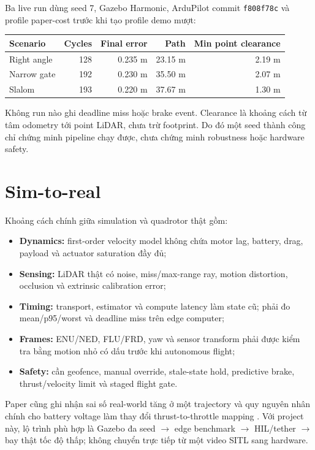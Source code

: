\documentclass[10pt,a4paper]{article}
\newcommand{\code}[1]{\texttt{#1}}
\begin{document}
Ba live run dùng seed 7, Gazebo Harmonic, ArduPilot commit \code{f808f78c} và
profile paper-cost trước khi tạo profile demo mượt:
\begin{center}\small
\begin{tabular}{lrrrr}
\toprule
\textbf{Scenario} & \textbf{Cycles} & \textbf{Final error} & \textbf{Path} & \textbf{Min point clearance}\\
\midrule
Right angle & 128 & 0.235 m & 23.15 m & 2.19 m\\
Narrow gate & 192 & 0.230 m & 35.50 m & 2.07 m\\
Slalom & 193 & 0.220 m & 37.67 m & 1.30 m\\
\bottomrule
\end{tabular}
\end{center}
Không run nào ghi deadline miss hoặc brake event. Clearance là khoảng cách từ
tâm odometry tới point LiDAR, chưa trừ footprint. Do đó một seed thành công chỉ
chứng minh pipeline chạy được, chưa chứng minh robustness hoặc hardware safety.

\section{Sim-to-real}

Khoảng cách chính giữa simulation và quadrotor thật gồm:
\begin{itemize}
  \item \textbf{Dynamics:} first-order velocity model không chứa motor lag,
  battery, drag, payload và actuator saturation đầy đủ;
  \item \textbf{Sensing:} LiDAR thật có noise, miss/max-range ray, motion
  distortion, occlusion và extrinsic calibration error;
  \item \textbf{Timing:} transport, estimator và compute latency làm state cũ;
  phải đo mean/p95/worst và deadline miss trên edge computer;
  \item \textbf{Frames:} ENU/NED, FLU/FRD, yaw và sensor transform phải được
  kiểm tra bằng motion nhỏ có dấu trước khi autonomous flight;
  \item \textbf{Safety:} cần geofence, manual override, stale-state hold,
  predictive brake, thrust/velocity limit và staged flight gate.
\end{itemize}

Paper cũng ghi nhận sai số real-world tăng ở một trajectory và quy nguyên nhân
chính cho battery voltage làm thay đổi thrust-to-throttle mapping
\cite{minarik2024agilemppi}. Với project này, lộ trình phù hợp là Gazebo đa
seed $\rightarrow$ edge benchmark $\rightarrow$ HIL/tether $\rightarrow$ bay
thật tốc độ thấp; không chuyển trực tiếp từ một video SITL sang hardware.
\end{document}
